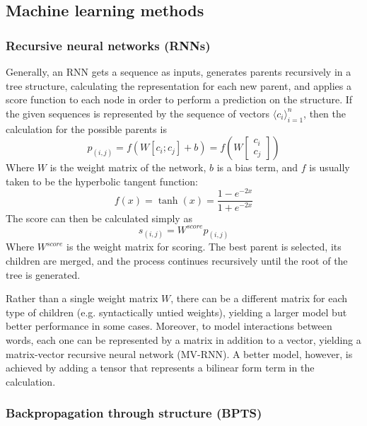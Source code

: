 \documentclass[11pt]{article}
\begin{document}
\subsection{Machine learning methods}

\subsubsection{Recursive neural networks (RNNs)}\label{subsec:rnns}

Generally, an RNN gets a sequence as inputs, generates parents recursively in a tree structure, calculating the representation for each new parent, and applies a score function to each node in order to perform a prediction on the structure. If the given sequences is represented by the sequence of vectors $\langle c_i\rangle_{i=1}^n$, then the calculation for the possible parents is
\begin{equation}
  p_{(i,j)} = f(W[c_i; c_j] + b) = f\left(W\left[\begin{array}{c} c_i \\ c_j \end{array}\right]\right)
\end{equation}
Where $W$ is the weight matrix of the network, $b$ is a bias term, and $f$ is usually taken to be the hyperbolic tangent function:
\begin{equation}
  f(x) = \tanh(x) = \frac{1-e^{-2x}}{1+e^{-2x}}
\end{equation}
The score can then be calculated simply as
\begin{equation}
  s_{(i,j)} = W^{score}p_{(i,j)}
\end{equation}
Where $W^{score}$ is the weight matrix for scoring. The best parent is selected, its children are merged, and the process continues recursively until the root of the tree is generated.

Rather than a single weight matrix $W$, there can be a different matrix for each type of children (e.g. syntactically untied weights\cite{socher2013parsing}), yielding a larger model but better performance in some cases. Moreover, to model interactions between words, each one can be represented by a matrix in addition to a vector, yielding a matrix-vector recursive neural network (MV-RNN)\cite{socher2012semantic}. A better model, however, is achieved by adding a tensor that represents a bilinear form term in the calculation\cite{socher2013recursive}.


\subsubsection{Backpropagation through structure (BPTS)}\label{subsec:bpts}
\end{document}
